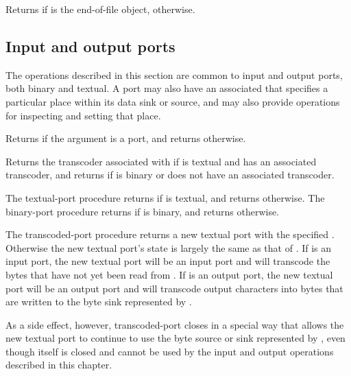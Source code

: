 \begin{entry}{%
}
  
Returns \schtrue{} if  is the end-of-file object, \schfalse{} otherwise.
\end{entry}

\subsection{Input and output ports}

The operations described in this section are common to input and
output ports, both binary and textual.  A port may also have an
associated  that specifies a particular place
within its data sink or source, and may also provide operations for
inspecting and setting that place.

\begin{entry}{%
}
   
Returns \schtrue{} if the argument is a port, and returns \schfalse{}
otherwise.
\end{entry}

\begin{entry}{%
}

Returns the transcoder associated with  if  is
textual and has an associated transcoder, and returns \schfalse{} if
 is binary or does not have an associated transcoder.
\end{entry}

\begin{entry}{%
}

The {\cf textual-port} procedure returns \schtrue{} if  is
textual, and returns \schfalse{} otherwise.
The {\cf binary-port} procedure returns \schtrue{} if  is
binary, and returns \schfalse{} otherwise.
\end{entry}

\begin{entry}{%
}

The {\cf transcoded-port} procedure
returns a new textual port with the specified .
Otherwise the new textual port's state is largely the same as
that of .
If  is an input port, the new textual
port will be an input port and
will transcode the bytes that have not yet been read from
.
If  is an output port, the new textual
port will be an output port and
will transcode output characters into bytes that are
written to the byte sink represented by .

As a side effect, however, {\cf transcoded-port}
closes  in
a special way that allows the new textual port to continue to
use the byte source or sink represented by ,
even though  itself is closed and cannot
be used by the input and output operations described in this
chapter.
\end{entry}

